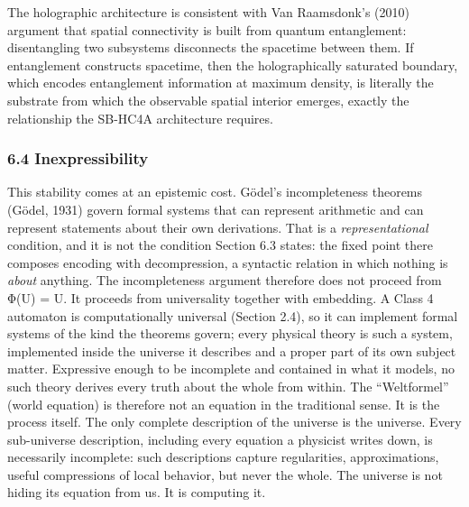 \documentclass[
]{article}
\begin{document}
The holographic architecture is consistent with Van Raamsdonk's (2010)
argument that spatial connectivity is built from quantum entanglement:
disentangling two subsystems disconnects the spacetime between them. If
entanglement constructs spacetime, then the holographically saturated
boundary, which encodes entanglement information at maximum density, is
literally the substrate from which the observable spatial interior
emerges, exactly the relationship the SB-HC4A architecture requires.

\hypertarget{inexpressibility}{%
\subsubsection{6.4 Inexpressibility}\label{inexpressibility}}

This stability comes at an epistemic cost. Gödel's incompleteness
theorems (Gödel, 1931) govern formal systems that can represent
arithmetic and can represent statements about their own derivations.
That is a \emph{representational} condition, and it is not the condition
Section 6.3 states: the fixed point there composes encoding with
decompression, a syntactic relation in which nothing is \emph{about}
anything. The incompleteness argument therefore does not proceed from
Φ(U) = U. It proceeds from universality together with embedding. A Class
4 automaton is computationally universal (Section 2.4), so it can
implement formal systems of the kind the theorems govern; every physical
theory is such a system, implemented inside the universe it describes
and a proper part of its own subject matter. Expressive enough to be
incomplete and contained in what it models, no such theory derives every
truth about the whole from within. The ``Weltformel'' (world equation)
is therefore not an equation in the traditional sense. It is the process
itself. The only complete description of the universe is the universe.
Every sub-universe description, including every equation a physicist
writes down, is necessarily incomplete: such descriptions capture
regularities, approximations, useful compressions of local behavior, but
never the whole. The universe is not hiding its equation from us. It is
computing it.
\end{document}
